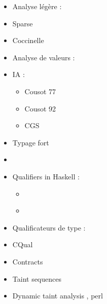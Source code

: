 \begin{itemize}
\item
  Analyse légère :
\item
  Sparse \cite{TorvaldsSparse}
\item
  Coccinelle \cite{coccinelle09} \cite{coccinelle11} 
\item
  Analyse de valeurs :
\item
  IA :
  \begin{itemize}
  \item
    Cousot 77 \cite{Cousot77}
  \item
    Cousot 92 \cite{Cousot92-1}
  \item
    CGS \cite{cgs}
  \end{itemize}
\item
  Typage fort
\item
  \cite{TAPL}
\item
  Qualifiers in Haskell :
  \begin{itemize}
  \item
    \cite{lightweight-static-capabilities}
  \item
    \cite{LZ06a}
  \end{itemize}
\item
  Qualificateurs de type :
\item
  CQual \cite{pldi99,usenix01,pldi02,cquk-usenix04,toplas-quals}
\item
  Contracts \cite{cssv}
\item
  Taint sequences \cite{mdv10}
\item
  Dynamic taint analysis \cite{oakland10}, perl
\end{itemize}
